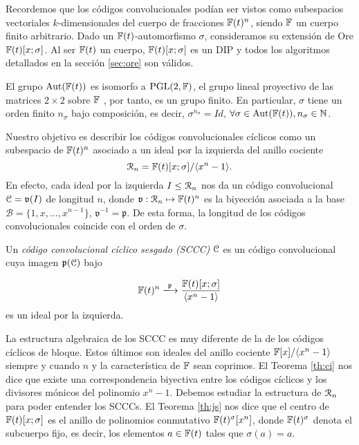 Recordemos que los códigos convolucionales podían ser vistos como subespacios vectoriales $k$-dimensionales del cuerpo de fracciones $\mathbb{F}(t)^n$, siendo $\mathbb{F}$ un cuerpo finito arbitrario. Dado un $\mathbb{F}(t)$-automorfismo $\sigma$, consideramos su extensión de Ore $\mathbb{F}(t)[x;\sigma]$. Al ser $\mathbb{F}(t)$ un cuerpo, $\mathbb{F}(t)[x;\sigma]$ es un DIP y todos los algoritmos detallados en la sección \ref{sec:ore} son válidos.

El grupo $\text{Aut}(\mathbb{F}(t))$ es isomorfo a $\text{PGL}(2,\mathbb{F})$, el grupo lineal proyectivo de las matrices $2 \times 2$ sobre $\mathbb{F}$ \cite[p. 198]{van1949modern}, por tanto, es un grupo finito. En particular, $\sigma$ tiene un orden finito $n_\sigma$ bajo composición, es decir, $\sigma^{n_\sigma} = Id$,$\ \forall \sigma \in \text{Aut}(\mathbb{F}(t)), n_\sigma \in \mathbb{N}$.

Nuestro objetivo es describir los códigos convolucionales cíclicos como un subespacio de $\mathbb{F}(t)^n$ asociado a un ideal por la izquierda del anillo cociente $$\mathcal{R}_n = \mathbb{F}(t)[x;\sigma]/\langle x^n - 1 \rangle.$$
En efecto, cada ideal por la izquierda $I \leq \mathcal R_n$ nos da un código convolucional $\mathcal C = \mathfrak{v}(I)$ de longitud $n$, donde $\mathfrak{v} : \mathcal R_n \mapsto \mathbb{F}(t)^n$ es la biyección asociada a la base $\mathcal{B} = \{1,x,\dots,x^{n-1}\}$, $\mathfrak{v}^{-1} = \mathfrak{p}$. De esta forma, la longitud de los códigos convolucionales coincide con el orden de $\sigma$.


\begin{definicion}

Un \emph{código convolucional cíclico sesgado (SCCC)} $\mathcal C$ es un código convolucional cuya imagen $\mathfrak{p}(\mathcal C)$ bajo

$$\F(t)^n \xlongrightarrow{\mathfrak{p}} \frac{\F(t)[x;\sigma]}{\langle x^n - 1 \rangle}$$ es un ideal por la izquierda.
\end{definicion}

La estructura algebraica de los SCCC es muy diferente de la de los códigos cíclicos de bloque. Estos últimos son ideales del anillo cociente $\mathbb{F}[x]/\langle x^n - 1 \rangle$ siempre y cuando $n$ y la característica de $\mathbb{F}$ sean coprimos. El Teorema \ref{th:ci} nos dice que existe una correspondencia biyectiva entre los códigos cíclicos y los divisores mónicos del polinomio $x^n -1$. Debemos estudiar la estructura de $\mathcal R_n$ para poder entender los SCCCs. El Teorema \ref{th:js} nos dice que el centro de $\mathbb{F}(t)[x;\sigma]$ es el anillo de polinomios conmutativo $\mathbb{F}(t)^{\sigma}[x^n]$, donde $\mathbb{F}(t)^{\sigma}$ denota el subcuerpo fijo, es decir, los elementos $a \in \mathbb{F}(t)$ tales que $\sigma(a) = a$.

